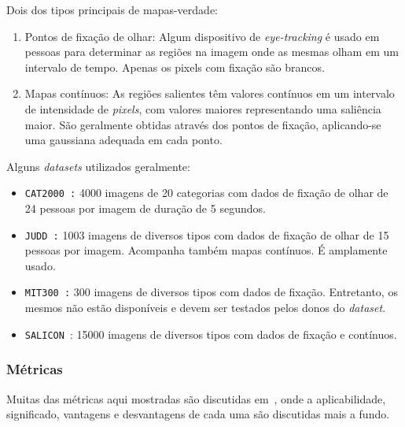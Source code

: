 \documentclass[11pt]{article}
\newcommand{\tit}[1]{\textit{#1}}
\newcommand{\ttt}[1]{\texttt{#1}}
\begin{document}
Dois dos tipos principais de mapas-verdade:
\begin{enumerate}
	\item Pontos de fixação de olhar: Algum dispositivo de
	\tit{eye-tracking} é usado em pessoas para determinar as regiões na imagem
	onde as mesmas olham em um intervalo de tempo. Apenas os pixels com
	fixação são brancos.

	\item Mapas contínuos: As regiões salientes têm valores
	contínuos em um intervalo de intensidade de \tit{pixels}, com valores
	maiores representando uma saliência maior.
	São geralmente obtidas através dos pontos de fixação, aplicando-se
	uma gaussiana adequada em cada ponto.
\end{enumerate}

Alguns \tit{datasets} utilizados geralmente:
\begin{itemize}
	\item \ttt{CAT2000~\cite{cat2000}:} 4000 imagens de 20 categorias com
		dados de fixação de olhar de 24 pessoas por imagem de duração de
		5 segundos.

	\item \ttt{JUDD~\cite{juddBM}:} 1003 imagens de diversos tipos com
		dados de fixação de olhar de 15 pessoas por imagem. Acompanha também
		mapas contínuos. É amplamente usado.

	\item \ttt{MIT300~\cite{mit-300}:} 300 imagens de diversos tipos
		com dados de fixação. Entretanto, os mesmos não estão disponíveis
		e devem ser testados pelos donos do \tit{dataset}.

    \item \ttt{SALICON}~\cite{jiang_2015}: 15000 imagens de diversos tipos
        com dados de fixação e contínuos.
\end{itemize}

\subsubsection{Métricas}
Muitas das métricas aqui mostradas são discutidas em~\cite{judd2},
onde a aplicabilidade, significado, vantagens e desvantagens
de cada uma são discutidas mais a fundo.
\end{document}
